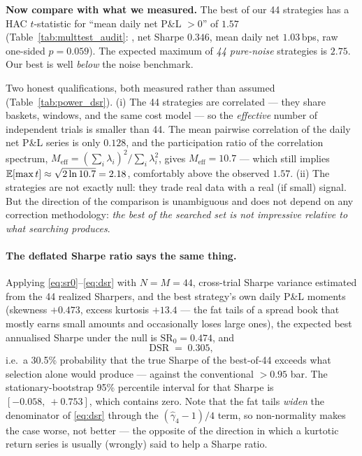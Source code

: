 \textbf{Now compare with what we measured.} The best of our 44 strategies has a HAC
$t$-statistic for ``mean daily net P\&L $>0$'' of $\mathbf{1.57}$
(Table~\ref{tab:multtest_audit}: , net Sharpe $0.346$, mean daily net
$1.03$\,bps, raw one-sided $p=0.059$). The expected maximum of \emph{44 pure-noise}
strategies is $2.75$. Our best is well \emph{below} the noise benchmark.

Two honest qualifications, both measured rather than assumed
(Table~\ref{tab:power_dsr}). (i) The 44 strategies are correlated --- they share baskets,
windows, and the same cost model --- so the \emph{effective} number of independent trials
is smaller than 44. The mean pairwise correlation of the daily net P\&L series is only
$0.128$, and the participation ratio of the correlation spectrum,
$M_{\text{eff}}=(\sum_i\lambda_i)^2/\sum_i\lambda_i^2$, gives $M_{\text{eff}}=10.7$ ---
which still implies $\mathbb{E}[\max t]\approx\sqrt{2\ln 10.7}=2.18$, comfortably above the
observed $1.57$. (ii) The strategies are not exactly null: they trade real data with a
real (if small) signal. But the direction of the comparison is unambiguous and does not
depend on any correction methodology: \emph{the best of the searched set is not impressive
relative to what searching produces}.

\paragraph{The deflated Sharpe ratio says the same thing.} Applying
\eqref{eq:sr0}--\eqref{eq:dsr} with $N=M=44$, cross-trial Sharpe variance estimated from
the 44 realized Sharpers, and the best strategy's own daily P\&L moments (skewness
$+0.473$, excess kurtosis $+13.4$ --- the fat tails of a spread book that mostly earns
small amounts and occasionally loses large ones), the expected best annualised Sharpe
under the null is $\mathrm{SR}_0 = 0.474$, and
\begin{equation}
  \mathrm{DSR} \;=\; 0.305 ,
  \label{eq:dsr:measured}
\end{equation}
i.e.\ a 30.5\% probability that the true Sharpe of the best-of-44 exceeds what selection
alone would produce --- against the conventional $>0.95$ bar. The stationary-bootstrap
95\% percentile interval for that Sharpe is $[-0.058,\ +0.753]$, which contains zero.
Note that the fat tails \emph{widen} the denominator of \eqref{eq:dsr} through the
$(\hat\gamma_4-1)/4$ term, so non-normality makes the case worse, not better --- the
opposite of the direction in which a kurtotic return series is usually (wrongly) said to
help a Sharpe ratio.

